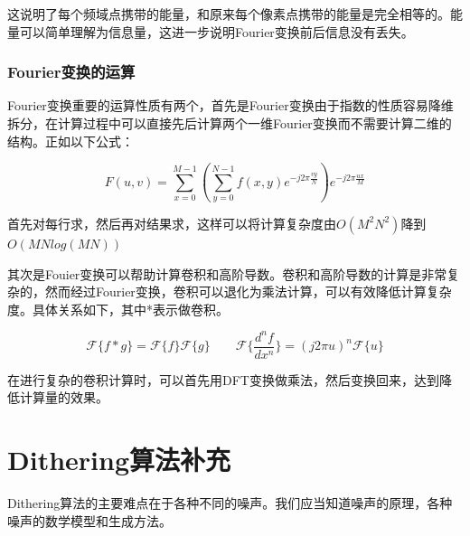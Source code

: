 \documentclass{ctexart}
\theoremstyle{cnthm}
\begin{document}
这说明了每个频域点携带的能量，和原来每个像素点携带的能量是完全相等的。能量可以简单理解为信息量，这进一步说明Fourier变换前后信息没有丢失。

\subsubsection{Fourier变换的运算}
Fourier变换重要的运算性质有两个，首先是Fourier变换由于指数的性质容易降维拆分，在计算过程中可以直接先后计算两个一维Fourier变换而不需要计算二维的结构。正如以下公式：

\[
F(u, v) = \sum_{x=0}^{M-1} \left( \sum_{y=0}^{N-1} f(x, y) e^{-j 2\pi \frac{vy}{N}} \right) e^{-j 2\pi \frac{ux}{M}}
\]

首先对每行求，然后再对结果求，这样可以将计算复杂度由$O(M^2 N^2)$降到$O(MNlog(MN))$

其次是Fouier变换可以帮助计算卷积和高阶导数。卷积和高阶导数的计算是非常复杂的，然而经过Fourier变换，卷积可以退化为乘法计算，可以有效降低计算复杂度。具体关系如下，其中*表示做卷积。

\[
\mathcal{F} \{f * g\} = \mathcal{F} \{f\} \mathcal{F} \{g\} \qquad \mathcal{F} \{\frac{d^n f}{d x^n}\} = (j 2\pi u)^n \mathcal{F} \{u\}
\]

在进行复杂的卷积计算时，可以首先用DFT变换做乘法，然后变换回来，达到降低计算量的效果。

\section{Dithering算法补充}

Dithering算法的主要难点在于各种不同的噪声。我们应当知道噪声的原理，各种噪声的数学模型和生成方法。
\end{document}
